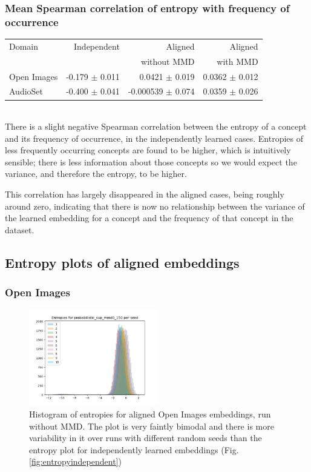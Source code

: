 \subsubsection{Mean Spearman correlation of entropy with frequency of occurrence}
\begin{tabular}{lrrr}
\toprule
Domain &   Independent & Aligned     &  Aligned  \\
       &               & without MMD &  with MMD \\
\midrule
Open Images    &  -0.179 $\pm$ 0.011 & 0.0421 $\pm$ 0.019 &     0.0362 $\pm$  0.012 \\
AudioSet    &  -0.400 $\pm$ 0.041 & -0.000539 $\pm$   0.074 &      0.0359  $\pm$ 0.026  \\
\bottomrule
\end{tabular}\\

There is a slight negative Spearman correlation between the entropy of a concept and its frequency of occurrence, in the independently learned cases. Entropies of less frequently occurring concepts are found to be higher, which is intuitively sensible; there is less information about those concepts so we would expect the variance, and therefore the entropy, to be higher. 

This correlation has largely disappeared in the aligned cases, being roughly around zero, indicating that there is now no relationship between the variance of the learned embedding for a concept and the frequency of that concept in the dataset. 

\subsection{Entropy plots of aligned embeddings}

\subsubsection{Open Images}

\begin{figure}[H]
    \centering
    \includegraphics[width=0.5\textwidth]{images/method/probabilistic_aligned/openimages/probabilistic_sup_mmd0_150_entropies.png}
    \caption{
        Histogram of entropies for aligned Open Images embeddings, run without MMD. The plot is very faintly bimodal and there is more variability in it over runs with different random seeds than the entropy plot for independently learned embeddings (Fig. \ref{fig:entropyindependent})
    }
\end{figure}

